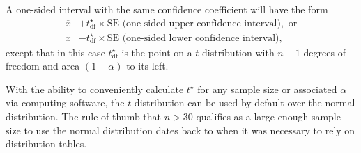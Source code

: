 A one-sided interval with the same confidence coefficient will have the form  
\begin{align*}
    \overline{x} &+ t_{\text{df}}^{\star} \times \text{SE} \text{   (one-sided upper confidence interval)}, \text{  or} \\
    \overline{x} &- t_{\text{df}}^{\star} \times \text{SE} \text{   (one-sided lower confidence interval)},
\end{align*}
except that in this case $t_{\text{df}}^{\star}$ is the point on a $t$-distribution with $n-1$ degrees of freedom and  area $(1 - \alpha)$ to its left.

With the ability to conveniently calculate $t^\star$ for any sample size or associated $\alpha$ via computing software, the $t$-distribution can be used by default over the normal distribution. The rule of thumb that $n > 30$ qualifies as a large enough sample size to use the normal distribution dates back to when it was necessary to rely on distribution tables.

